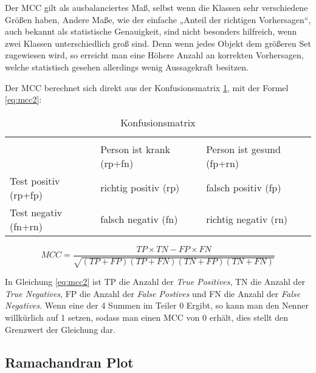 Der MCC gilt als ausbalanciertes Maß, selbst wenn die Klassen sehr verschiedene Größen haben, Andere Maße, wie der einfache „Anteil der richtigen Vorhersagen“, auch bekannt als statistische Genauigkeit, sind nicht besonders hilfreich, wenn zwei Klassen unterschiedlich groß sind. Denn wenn jedes Objekt dem größeren Set zugewiesen wird, so erreicht man eine Höhere Anzahl an korrekten Vorhersagen, welche statistisch gesehen allerdings wenig Aussagekraft besitzen.


Der MCC berechnet sich direkt aus der Konfusionsmatrix \ref{table:konfusionsmatrix}, mit der Formel \ref{eq:mcc2}:

\begin{table}[]
\centering
\caption{Konfusionsmatrix }
\label{table:konfusionsmatrix}
\begin{tabular}{lll}
 &  &  \\ \cline{2-3} 
\multicolumn{1}{l|}{} & \multicolumn{1}{l|}{Person ist krank (rp+fn)} & \multicolumn{1}{l|}{Person ist gesund (fp+rn)} \\ \hline
\multicolumn{1}{|l|}{Test positiv (rp+fp)} & \multicolumn{1}{l|}{richtig positiv (rp)} & \multicolumn{1}{l|}{falsch positiv (fp)} \\ \hline
\multicolumn{1}{|l|}{Test negativ (fn+rn)} & \multicolumn{1}{l|}{falsch negativ (fn)} & \multicolumn{1}{l|}{richtig negativ (rn)} \\ \hline
\end{tabular}
\end{table}

\begin{equation}
    MCC = \frac{TP \times TN - FP \times FN}{\sqrt{(TP + FP)(TP + FN)(TN + FP)(TN + FN)}}
    \label{eq:mcc2}
\end{equation}

In Gleichung \ref{eq:mcc2} ist TP die Anzahl der \emph{True Positives}, TN die Anzahl der \emph{True Negatives}, FP die Anzahl der \emph{False Postives} und FN die Anzahl der \emph{False Negatives}. Wenn eine der 4 Summen im Teiler 0 Ergibt, so kann man den Nenner willkürlich auf 1 setzen, sodass man einen MCC von 0 erhält, dies stellt den Grenzwert der Gleichung dar.


\subsection{Ramachandran Plot}

